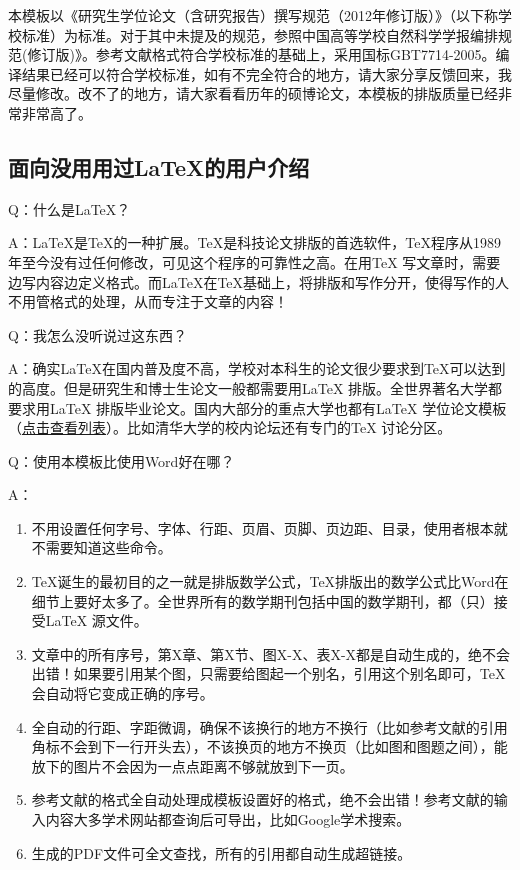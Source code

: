 本模板以《研究生学位论文（含研究报告）撰写规范（2012年修订版）》（以下称学校标准）为标准。对于其中未提及的规范，参照中国高等学校自然科学学报编排规范(修订版)》。参考文献格式符合学校标准的基础上，采用国标GBT7714-2005。编译结果已经可以符合学校标准，如有不完全符合的地方，请大家分享反馈回来，我尽量修改。改不了的地方，请大家看看历年的硕博论文，本模板的排版质量已经非常非常高了。
\subsection{面向没用用过\LaTeX{}的用户介绍}
    Q：什么是\LaTeX{}？

A：\LaTeX{}是\TeX{}的一种扩展。\TeX{}是科技论文排版的首选软件，\TeX{}程序从1989 年至今没有过任何修改，可见这个程序的可靠性之高。在用\TeX{} 写文章时，需要边写内容边定义格式。而\LaTeX{}在\TeX{}基础上，将排版和写作分开，使得写作的人不用管格式的处理，从而专注于文章的内容！

Q：我怎么没听说过这东西？

A：确实\LaTeX{}在国内普及度不高，学校对本科生的论文很少要求到\TeX{}可以达到的高度。但是研究生和博士生论文一般都需要用\LaTeX{} 排版。全世界著名大学都要求用\LaTeX{} 排版毕业论文。国内大部分的重点大学也都有\LaTeX{} 学位论文模板（\href{http://zzg34b.w3.c361.com/templet/graduateThesis.htm}{点击查看列表}）。比如清华大学的校内论坛还有专门的TeX 讨论分区。

Q：使用本模板比使用Word好在哪？

A：
\begin{enumerate}
\item 不用设置任何字号、字体、行距、页眉、页脚、页边距、目录，使用者根本就不需要知道这些命令。
\item \TeX{}诞生的最初目的之一就是排版数学公式，\TeX{}排版出的数学公式比Word在细节上要好太多了。全世界所有的数学期刊包括中国的数学期刊，都（只）接受\LaTeX{} 源文件。
\item 文章中的所有序号，第X章、第X节、图X-X、表X-X都是自动生成的，绝不会出错！如果要引用某个图，只需要给图起一个别名，引用这个别名即可，TeX 会自动将它变成正确的序号。
\item 全自动的行距、字距微调，确保不该换行的地方不换行（比如参考文献的引用角标不会到下一行开头去），不该换页的地方不换页（比如图和图题之间），能放下的图片不会因为一点点距离不够就放到下一页。
\item 参考文献的格式全自动处理成模板设置好的格式，绝不会出错！参考文献的输入内容大多学术网站都查询后可导出，比如Google学术搜索。
\item 生成的PDF文件可全文查找，所有的引用都自动生成超链接。
\end{enumerate}

